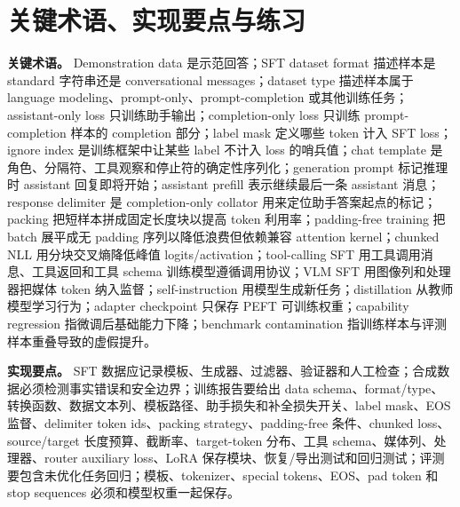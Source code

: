 \documentclass[UTF8,zihao=-4,openany]{ctexbook}
\begin{document}
\section{关键术语、实现要点与练习}
\textbf{关键术语。} Demonstration data 是示范回答；SFT dataset format 描述样本是 standard 字符串还是 conversational messages；dataset type 描述样本属于 language modeling、prompt-only、prompt-completion 或其他训练任务；assistant-only loss 只训练助手输出；completion-only loss 只训练 prompt-completion 样本的 completion 部分；label mask 定义哪些 token 计入 SFT loss；ignore index 是训练框架中让某些 label 不计入 loss 的哨兵值；chat template 是角色、分隔符、工具观察和停止符的确定性序列化；generation prompt 标记推理时 assistant 回复即将开始；assistant prefill 表示继续最后一条 assistant 消息；response delimiter 是 completion-only collator 用来定位助手答案起点的标记；packing 把短样本拼成固定长度块以提高 token 利用率；padding-free training 把 batch 展平成无 padding 序列以降低浪费但依赖兼容 attention kernel；chunked NLL 用分块交叉熵降低峰值 logits/activation；tool-calling SFT 用工具调用消息、工具返回和工具 schema 训练模型遵循调用协议；VLM SFT 用图像列和处理器把媒体 token 纳入监督；self-instruction 用模型生成新任务；distillation 从教师模型学习行为；adapter checkpoint 只保存 PEFT 可训练权重；capability regression 指微调后基础能力下降；benchmark contamination 指训练样本与评测样本重叠导致的虚假提升。

\textbf{实现要点。} SFT 数据应记录模板、生成器、过滤器、验证器和人工检查；合成数据必须检测事实错误和安全边界；训练报告要给出 data schema、format/type、转换函数、数据文本列、模板路径、助手损失和补全损失开关、label mask、EOS 监督、delimiter token ids、packing strategy、padding-free 条件、chunked loss、source/target 长度预算、截断率、target-token 分布、工具 schema、媒体列、处理器、router auxiliary loss、LoRA 保存模块、恢复/导出测试和回归测试；评测要包含未优化任务回归；模板、tokenizer、special tokens、EOS、pad token 和 stop sequences 必须和模型权重一起保存。
\end{document}
